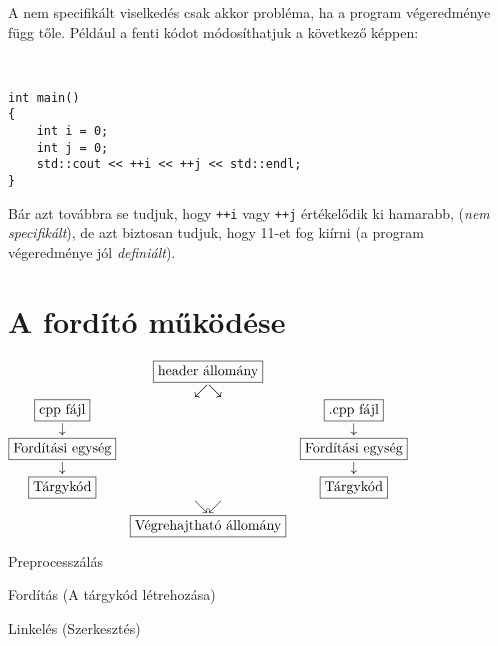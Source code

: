 \documentclass[a4paper,11.5pt]{article}
\begin{document}
	A nem specifikált viselkedés csak akkor probléma, ha a program végeredménye függ tőle. Például a fenti kódot módosíthatjuk a következő képpen:
	
	\begin{example}\ 
		
		\begin{lstlisting}
int main()
{
	int i = 0;
	int j = 0;
	std::cout << ++i << ++j << std::endl;
}
		\end{lstlisting}
	\end{example}
	Bár azt továbbra se tudjuk, hogy \texttt{++i} vagy \texttt{++j} értékelődik ki hamarabb, (\textit{nem specifikált}), de azt biztosan tudjuk, hogy 11-et fog kiírni (a program végeredménye jól \textit{definiált}).
	
	\section{A fordító működése}
	
	\begin{center}
		$\begin{matrix}
    &\fbox{\text{header állomány}}\\
		&\swarrow\searrow&\\
    \fbox{\text{cpp fájl}}&&\fbox{\text{.cpp fájl}}\\
		\downarrow&&\downarrow\\
		\fbox{Fordítási egység}&&\fbox{Fordítási egység}\\
		\downarrow&&\downarrow\\
		\fbox{Tárgykód}&&\fbox{Tárgykód}\\
		&\searrow\swarrow&\\
		&\fbox{Végrehajtható állomány}&
	\end{matrix}$
	\end{center}
	\begin{compactitem}
		\item Preprocesszálás
    \item Fordítás (A tárgykód létrehozása)
    \item Linkelés (Szerkesztés)
	\end{compactitem}
\end{document}

